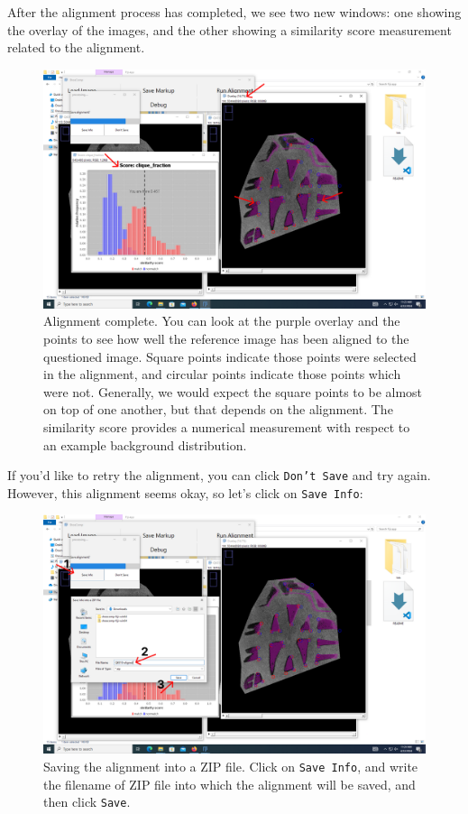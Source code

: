 \documentclass{csafedoc}
\begin{document}
After the alignment process has completed, we see two new windows: one showing the overlay
of the images, and the other showing a similarity score measurement related to the
alignment.

\begin{figure}[H]
	\begin{center}
		\includegraphics[width=0.8\linewidth]{images/step_8c-anno.png}
	\end{center}
	\caption{Alignment complete. You can look at the purple overlay and the points to see how well the reference image has been aligned to the questioned image. Square points indicate those points were selected in the alignment, and circular points indicate those points which were not. Generally, we would expect the square points to be almost on top of one another, but that depends on the alignment. The similarity score provides a numerical measurement with respect to an example background distribution.}
	\label{fig:step8c}
\end{figure}

If you'd like to retry the alignment, you can click \texttt{Don't Save} and try again.
However, this alignment seems okay, so let's click on \texttt{Save Info}:

\begin{figure}[H]
	\begin{center}
		\includegraphics[width=0.8\linewidth]{images/step_8d-anno.png}
	\end{center}
	\caption{Saving the alignment into a ZIP file. Click on \texttt{Save Info}, and write the
		filename of ZIP file into which the alignment will be saved, and then click \texttt{Save}.}
	\label{fig:step8d}
\end{figure}
\end{document}
